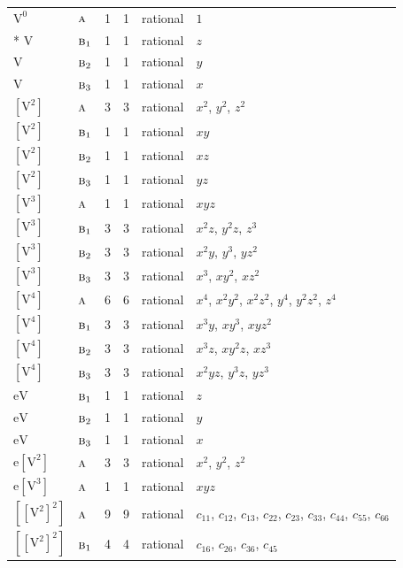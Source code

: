 \documentclass[10pt,a4paper]{article}
\numberwithin{equation}{section}
\newcommand{\irr}[1]{\text{\normalfont\scshape #1}}
\newcommand{\jahn}[1]{\mathrm{#1}}
\newlength{\fillwidth}\newlength{\cellwidth}\newlength{\colwidth}
\begin{document}
{\begin{longtable}{@{}llrrl>{\RaggedRight\arraybackslash}p{\fillwidth}@{}}
\bottomrule\endfoot\endlastfoot
$\jahn{V^{0}}$ & $\irr{a}$ & 1 & 1 & rational & $1$\\*
$\jahn{V}$ & $\irr{b}_{1}$ & 1 & 1 & rational & $z$\\
$\jahn{V}$ & $\irr{b}_{2}$ & 1 & 1 & rational & $y$\\
$\jahn{V}$ & $\irr{b}_{3}$ & 1 & 1 & rational & $x$\\
$\jahn{[V^{2}]}$ & $\irr{a}$ & 3 & 3 & rational & $x^{2}$, $y^{2}$, $z^{2}$\\
$\jahn{[V^{2}]}$ & $\irr{b}_{1}$ & 1 & 1 & rational & $xy$\\
$\jahn{[V^{2}]}$ & $\irr{b}_{2}$ & 1 & 1 & rational & $xz$\\
$\jahn{[V^{2}]}$ & $\irr{b}_{3}$ & 1 & 1 & rational & $yz$\\
$\jahn{[V^{3}]}$ & $\irr{a}$ & 1 & 1 & rational & $xyz$\\
$\jahn{[V^{3}]}$ & $\irr{b}_{1}$ & 3 & 3 & rational & $x^{2}z$, $y^{2}z$, $z^{3}$\\
$\jahn{[V^{3}]}$ & $\irr{b}_{2}$ & 3 & 3 & rational & $x^{2}y$, $y^{3}$, $yz^{2}$\\
$\jahn{[V^{3}]}$ & $\irr{b}_{3}$ & 3 & 3 & rational & $x^{3}$, $xy^{2}$, $xz^{2}$\\
$\jahn{[V^{4}]}$ & $\irr{a}$ & 6 & 6 & rational & $x^{4}$, $x^{2}y^{2}$, $x^{2}z^{2}$, $y^{4}$, $y^{2}z^{2}$, $z^{4}$\\
$\jahn{[V^{4}]}$ & $\irr{b}_{1}$ & 3 & 3 & rational & $x^{3}y$, $xy^{3}$, $xyz^{2}$\\
$\jahn{[V^{4}]}$ & $\irr{b}_{2}$ & 3 & 3 & rational & $x^{3}z$, $xy^{2}z$, $xz^{3}$\\
$\jahn{[V^{4}]}$ & $\irr{b}_{3}$ & 3 & 3 & rational & $x^{2}yz$, $y^{3}z$, $yz^{3}$\\
$\jahn{eV}$ & $\irr{b}_{1}$ & 1 & 1 & rational & $z$\\
$\jahn{eV}$ & $\irr{b}_{2}$ & 1 & 1 & rational & $y$\\
$\jahn{eV}$ & $\irr{b}_{3}$ & 1 & 1 & rational & $x$\\
$\jahn{e[V^{2}]}$ & $\irr{a}$ & 3 & 3 & rational & $x^{2}$, $y^{2}$, $z^{2}$\\
$\jahn{e[V^{3}]}$ & $\irr{a}$ & 1 & 1 & rational & $xyz$\\
$\jahn{[[V^{2}]^{2}]}$ & $\irr{a}$ & 9 & 9 & rational & $c_{11}$, $c_{12}$, $c_{13}$, $c_{22}$, $c_{23}$, $c_{33}$, $c_{44}$, $c_{55}$, $c_{66}$\\
$\jahn{[[V^{2}]^{2}]}$ & $\irr{b}_{1}$ & 4 & 4 & rational & $c_{16}$, $c_{26}$, $c_{36}$, $c_{45}$\\

\end{longtable}}
\end{document}
